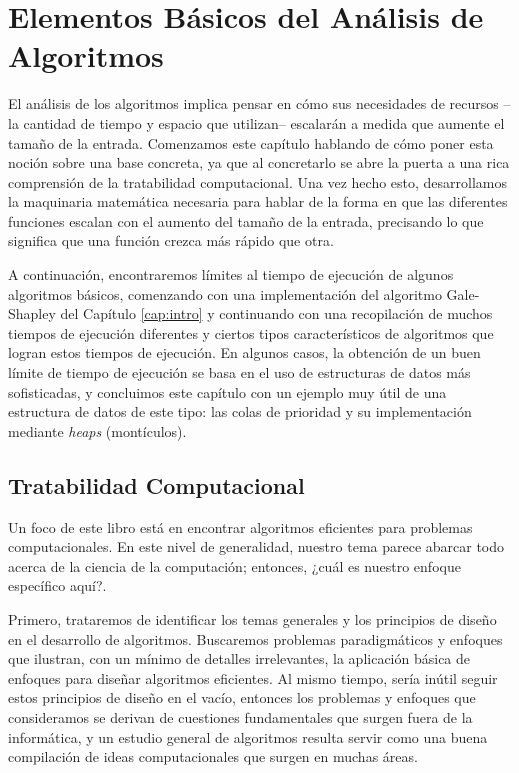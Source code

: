 \documentclass[a4paper, 12pt]{book}
\theoremstyle{dotless}
\begin{document}
\chapter{Elementos Básicos del Análisis de Algoritmos}

El análisis de los algoritmos implica pensar en cómo sus necesidades de recursos --la cantidad de tiempo y espacio que utilizan-- escalarán a medida que aumente el tamaño de la entrada. Comenzamos este capítulo hablando de cómo poner esta noción sobre una base concreta, ya que al concretarlo se abre la puerta a una rica comprensión de la tratabilidad computacional. Una vez hecho esto, desarrollamos la maquinaria matemática necesaria para hablar de la forma en que las diferentes funciones escalan con el aumento del tamaño de la entrada, precisando lo que significa que una función crezca más rápido que otra.

A continuación, encontraremos límites al tiempo de ejecución de algunos algoritmos básicos, comenzando con una implementación del algoritmo Gale-Shapley del Capítulo \ref{cap:intro} y continuando con una recopilación de muchos tiempos de ejecución diferentes y ciertos tipos característicos de algoritmos que logran estos tiempos de ejecución. En algunos casos, la obtención de un buen límite de tiempo de ejecución se basa en el uso de estructuras de datos más sofisticadas, y concluimos este capítulo con un ejemplo muy útil de una estructura de datos de este tipo: las colas de prioridad y su implementación mediante \textit{heaps} (montículos).

\section{Tratabilidad Computacional}

Un foco de este libro está en encontrar algoritmos eficientes para problemas computacionales. En este nivel de generalidad, nuestro tema parece abarcar todo acerca de la ciencia de la computación; entonces, ¿cuál es nuestro enfoque específico aquí?. 

Primero, trataremos de identificar los temas generales y los principios de diseño en el desarrollo de algoritmos. Buscaremos problemas paradigmáticos y enfoques que ilustran, con un mínimo de detalles irrelevantes, la aplicación básica de enfoques para diseñar algoritmos eficientes. Al mismo tiempo, sería inútil seguir estos principios de diseño en el vacío, entonces los problemas y enfoques que consideramos se derivan de cuestiones fundamentales que surgen fuera de la informática, y un estudio general de algoritmos resulta servir como una buena compilación de ideas computacionales que surgen en muchas áreas. 
\end{document}
